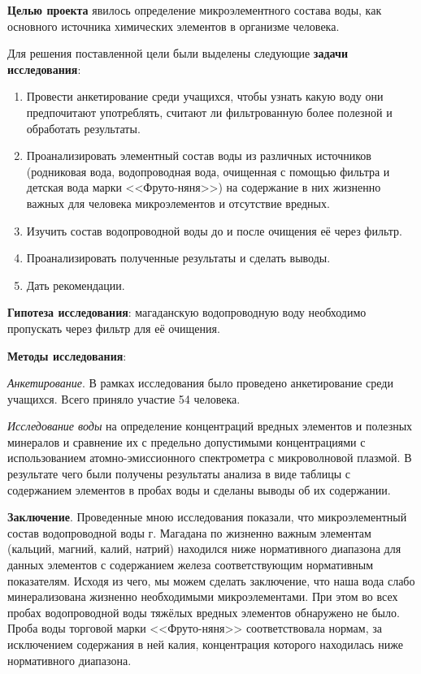 


\makeProcTitleSchool


\textbf{Целью проекта} явилось определение микроэлементного состава воды, как основного источника химических элементов в организме человека.

Для решения поставленной цели были выделены следующие \textbf{задачи исследования}:
\begin{enumerate}[noitemsep]\vspace{-8pt}
\item Провести анкетирование среди учащихся, чтобы узнать какую воду они предпочитают употреблять, считают ли фильтрованную более полезной и обработать результаты.
\item Проанализировать элементный состав воды из различных источников (родниковая вода, водопроводная вода, очищенная с помощью фильтра и детская вода марки <<Фруто-няня>>) на содержание в них жизненно важных для человека микроэлементов и отсутствие вредных.
\item Изучить состав водопроводной воды до и после очищения её через фильтр.
\item Проанализировать полученные результаты и сделать выводы.
\item Дать рекомендации.
\end{enumerate}\vspace{-8pt}
\textbf{Гипотеза исследования}: магаданскую водопроводную воду необходимо пропускать через фильтр для её очищения.

\textbf{Методы исследования}:

\textit{Анкетирование}. В рамках исследования было проведено анкетирование среди учащихся. Всего приняло участие 54 человека.

\textit{Исследование воды} на определение концентраций вредных элементов и полезных минералов и сравнение их с предельно допустимыми концентрациями с использованием атомно-эмиссионного спектрометра с микроволновой плазмой. В результате чего были получены результаты анализа в виде таблицы с содержанием элементов в пробах воды и сделаны выводы об их содержании.

\textbf{Заключение}. Проведенные мною исследования показали, что микроэлементный состав водопроводной воды г. Магадана по жизненно важным элементам (кальций, магний, калий, натрий) находился ниже нормативного диапазона для данных элементов с содержанием железа соответствующим нормативным показателям. Исходя из чего, мы можем сделать заключение, что наша вода слабо минерализована жизненно необходимыми микроэлементами. При этом во всех пробах водопроводной воды тяжёлых вредных элементов обнаружено не было. Проба воды торговой марки <<Фруто-няня>> соответствовала нормам, за исключением содержания в ней калия, концентрация которого находилась ниже нормативного диапазона.

